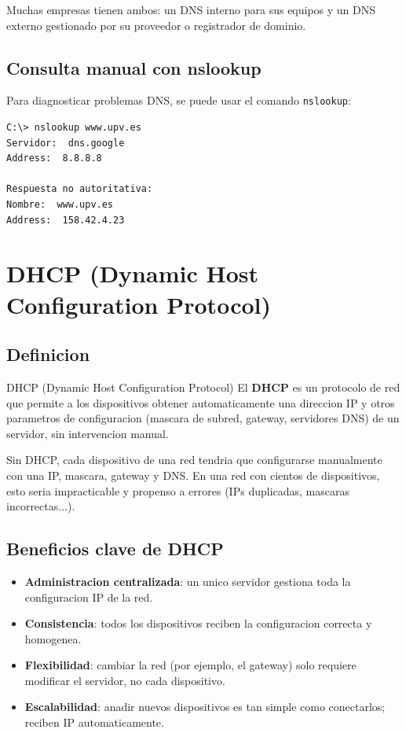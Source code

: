Muchas empresas tienen ambos: un DNS interno para sus equipos y un DNS
externo gestionado por su proveedor o registrador de dominio.

\subsection{Consulta manual con nslookup}

Para diagnosticar problemas DNS, se puede usar el comando \texttt{nslookup}:

\begin{lstlisting}[language=bash,caption={Consulta DNS con nslookup},label={lst:nslookup}]
C:\> nslookup www.upv.es
Servidor:  dns.google
Address:  8.8.8.8

Respuesta no autoritativa:
Nombre:  www.upv.es
Address:  158.42.4.23
\end{lstlisting}


\section{DHCP (Dynamic Host Configuration Protocol)}

\subsection{Definicion}

\begin{definicion}{DHCP (Dynamic Host Configuration Protocol)}
El \textbf{DHCP} es un protocolo de red que permite a los dispositivos obtener
automaticamente una direccion IP y otros parametros de configuracion (mascara de
subred, gateway, servidores DNS) de un servidor, sin intervencion manual.
\end{definicion}

Sin DHCP, cada dispositivo de una red tendria que configurarse manualmente con
una IP, mascara, gateway y DNS. En una red con cientos de dispositivos, esto seria
impracticable y propenso a errores (IPs duplicadas, mascaras incorrectas...).

\subsection{Beneficios clave de DHCP}

\begin{itemize}
    \item \textbf{Administracion centralizada}: un unico servidor gestiona toda la
    configuracion IP de la red.
    \item \textbf{Consistencia}: todos los dispositivos reciben la configuracion
    correcta y homogenea.
    \item \textbf{Flexibilidad}: cambiar la red (por ejemplo, el gateway) solo requiere
    modificar el servidor, no cada dispositivo.
    \item \textbf{Escalabilidad}: anadir nuevos dispositivos es tan simple como
    conectarlos; reciben IP automaticamente.
\end{itemize}

